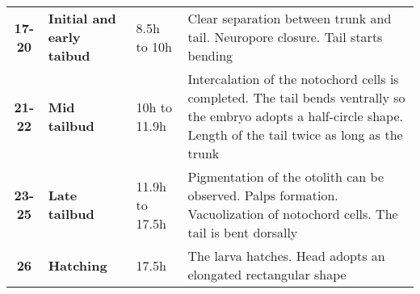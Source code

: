 \begin{sidewaystable}
\begin{tabular}{|c|p{3cm}|p{3cm}|p{10cm}|}
%
\textbf{17-20}	& \textbf{Initial and early taibud}	& 8.5h to 10h	& Clear separation between trunk and tail. Neuropore closure. Tail starts bending \\
%
\textbf{21-22}	& \textbf{Mid tailbud}	& 10h to 11.9h	& Intercalation of the notochord cells is completed. The tail bends ventrally so the embryo adopts a half-circle shape. Length of the tail twice as long as the trunk	\\
%
\textbf{23-25}	& \textbf{Late tailbud}	& 11.9h to 17.5h 	& Pigmentation of the otolith can be observed. Palps formation. Vacuolization of notochord cells. The tail is bent dorsally   \\
%
\textbf{26}		& \textbf{Hatching}	& 17.5h 	& The larva hatches. Head adopts an elongated rectangular shape \\

\hline
\end{tabular}
\end{sidewaystable}
